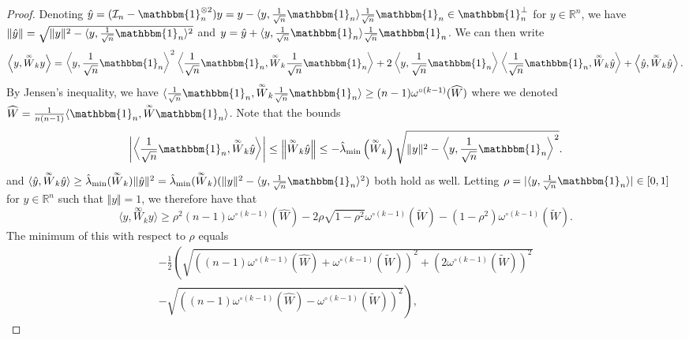 \documentclass[twoside,11pt]{article}
\newcommand{\R}{\mathbb{R}}
\newcommand{\Id}{\mathcal{I}}
\newcommand{\limiting}[1]{\overset{\scriptscriptstyle\infty}{#1}}
\begin{document}
\begin{proof}
Denoting $\hat{y} = (\Id_n - \mathbbm{1}_n^{\otimes 2}) y = y - \langle y, \frac{1}{\sqrt{n}} \mathbbm{1}_n \rangle \frac{1}{\sqrt{n}} \mathbbm{1}_n \in \mathbbm{1}_n^{\perp}$ for $y \in \R^n$, we have $\Vert \hat{y} \Vert = \sqrt{\Vert y \Vert^2 - \langle y, \frac{1}{\sqrt{n}} \mathbbm{1}_n \rangle^2}$ and $y = \hat{y} + \langle y, \frac{1}{\sqrt{n}} \mathbbm{1}_n \rangle \frac{1}{\sqrt{n}} \mathbbm{1}_n$. We can then write
\[
\left\langle y, \limiting{W}_k y \right\rangle 
= \left\langle y, \frac{1}{\sqrt{n}} \mathbbm{1}_n \right\rangle^2 \left\langle \frac{1}{\sqrt{n}} \mathbbm{1}_n, \limiting{W}_k \frac{1}{\sqrt{n}} \mathbbm{1}_n \right\rangle + 2 \left\langle y, \frac{1}{\sqrt{n}} \mathbbm{1}_n \right\rangle \left\langle \frac{1}{\sqrt{n}} \mathbbm{1}_n, \limiting{W}_k \hat{y} \right\rangle + \left\langle \hat{y}, \limiting{W}_k \hat{y} \right\rangle.
\]
By Jensen's inequality, we have $\langle \frac{1}{\sqrt{n}} \mathbbm{1}_n, \limiting{W}_k \frac{1}{\sqrt{n}} \mathbbm{1}_n \rangle \geq (n-1) \omega^{\circ (k-1)}(\widehat{W})$ where we denoted $\widehat{W} = \frac{1}{n(n-1)} \langle \mathbbm{1}_n, \limiting{W} \mathbbm{1}_n \rangle$. Note that the bounds
\[
\left\vert \left\langle \frac{1}{\sqrt{n}} \mathbbm{1}_n, \limiting{W}_k \hat{y} \right\rangle \right\vert 
\leq \left\Vert \limiting{W}_k \hat{y} \right\Vert 
\leq -\hat{\lambda}_{\min}\left( \limiting{W}_k \right) \sqrt{\Vert y \Vert^2 - \left\langle y, \frac{1}{\sqrt{n}} \mathbbm{1}_n \right\rangle^2}.
\]
and $\langle \hat{y}, \limiting{W}_k \hat{y} \rangle \geq \hat{\lambda}_{\min}(\limiting{W}_k) \Vert \hat{y} \Vert^2 = \hat{\lambda}_{\min}(\limiting{W}_k) (\Vert y \Vert^2 - \langle y, \frac{1}{\sqrt{n}} \mathbbm{1}_n \rangle^2)$ both hold as well. Letting $\rho = \vert \langle  y, \frac{1}{\sqrt{n}} \mathbbm{1}_n \rangle \vert \in [0,1]$ for $y \in \R^n$ such that $\Vert y \Vert = 1$, we therefore have that
\[
\langle y, \limiting{W}_k y \rangle
\geq \rho^2 (n-1) \omega^{\circ (k-1)}\left( \widehat{W} \right)
- 2 \rho \sqrt{1 - \rho^2} \omega^{\circ (k-1)}\left( \widetilde{W} \right)
- (1 - \rho^2) \omega^{\circ (k-1)}\left( \widetilde{W} \right).
\]
The minimum of this with respect to $\rho$ equals
\begin{multline*}
-\frac{1}{2} \left( \sqrt{\left( (n-1) \omega^{\circ (k-1)}\left( \widehat{W} \right) + \omega^{\circ (k-1)}\left( \widetilde{W} \right) \right)^2 + \left( 2 \omega^{\circ (k-1)}\left( \widetilde{W} \right) \right)^2}
\right. \\ \left.
- \sqrt{\left( (n-1) \omega^{\circ (k-1)}\left( \widehat{W} \right) - \omega^{\circ (k-1)}\left( \widetilde{W} \right) \right)^2} \right),

\end{multline*}
\end{proof}
\end{document}
